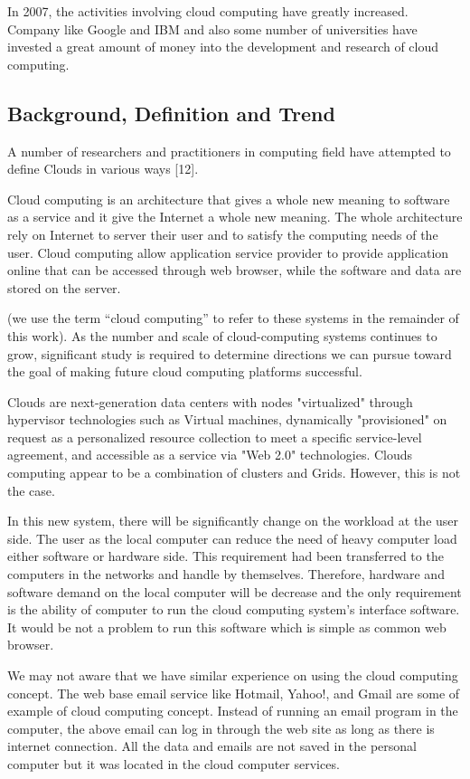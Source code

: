 \documentclass[conference, compsoc]{IEEEtran}
\begin{document}
In 2007, the activities involving cloud computing have greatly increased. Company like Google and IBM and also some number of universities have invested a great amount of money into the development and research of cloud computing.

\vspace{.5cm}	
\subsection{Background, Definition and Trend}

A number of researchers and practitioners in computing field have attempted to define Clouds in various ways [12].

Cloud computing is an architecture that gives a whole new meaning to software as a service and it give the Internet a whole new meaning. The whole architecture rely on Internet to server their user and to satisfy the computing needs of the user. Cloud computing allow application service provider to provide application online that can be accessed through web browser, while the software and data are stored on the server.

(we use the term “cloud computing” to refer to these systems in the remainder of this work). As the number and scale of cloud-computing systems continues to grow, significant study is required to determine directions we can pursue toward the goal of making future cloud computing platforms successful.

Clouds are next-generation data centers with nodes "virtualized" through hypervisor technologies such as Virtual machines, dynamically "provisioned" on request as a personalized resource collection to meet a specific service-level agreement, and accessible as a service via "Web 2.0" technologies. Clouds computing appear to be a combination of clusters and Grids. However, this is not the case.

In this new system, there will be significantly change on the workload at the user side. The user as the local computer can reduce the need of heavy computer load either software or hardware side. This requirement had been transferred to the computers in the networks and handle by themselves. Therefore, hardware and software demand on the local computer will be decrease and the only requirement is the ability of computer to run the cloud computing system's interface software.  It would be not a problem to run this software which is simple as common web browser. 

We may not aware that we have similar experience on using the cloud computing concept. The web base email service like Hotmail, Yahoo!, and Gmail are some of example of cloud computing concept. Instead of running an email program in the computer, the above email can log in through the web site as long as there is internet connection. All the data and emails are not saved in the personal computer but it was located in the cloud computer services.
\end{document}
